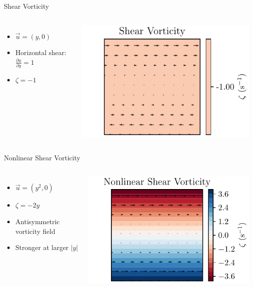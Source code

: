 \begin{frame}{Shear Vorticity}
	\begin{columns}
		\begin{itemize}
			\item \( \vec{u} = (y, 0) \)
			\item Horizontal shear: \( \frac{\partial u}{\partial y} = 1 \)
			\item \( \zeta = -1 \)
		\end{itemize}

		\includegraphics[width=\linewidth]{../images/vorticity_plot1.pdf}
	\end{columns}
\end{frame}

\begin{frame}{Nonlinear Shear Vorticity}
	\begin{columns}
		\column{0.5\textwidth}
		\begin{itemize}
			\item \( \vec{u} = (y^2, 0) \)
			\item \( \zeta = -2y \)
			\item Antisymmetric vorticity field
			\item Stronger at larger \( |y| \)
		\end{itemize}

		\column{0.5\textwidth}
		\includegraphics[width=\linewidth]{../images/vorticity_plot2.pdf}
	\end{columns}
\end{frame}

